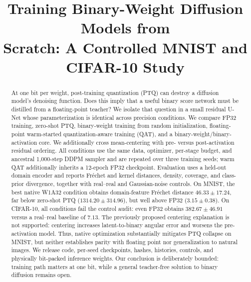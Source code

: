 \documentclass[conference]{IEEEtran}
\begin{document}
\title{Training Binary-Weight Diffusion Models from\\
Scratch: A Controlled MNIST and CIFAR-10 Study}

\author{
\and
{}
\and
{}
}

\maketitle

\begin{abstract}
At one bit per weight, post-training quantization (PTQ) can destroy a diffusion
model's denoising function. Does this imply that a useful binary score network
must be distilled from a floating-point teacher? We isolate that question in a
small residual U-Net whose parameterization is identical across precision
conditions. We compare FP32 training, zero-shot PTQ, binary-weight training from
random initialization, floating-point warm-started quantization-aware training
(QAT), and a binary-weight/binary-activation core. We additionally cross
mean-centering with pre- versus post-activation residual ordering. All conditions
use the same data, optimizer, per-stage budget, and ancestral 1,000-step DDPM
sampler and are repeated over three training seeds; warm QAT additionally
inherits a 12-epoch FP32 checkpoint. Evaluation uses a held-out
domain encoder and reports Fr\'echet and kernel distances, density, coverage, and
class-prior divergence, together with real--real and Gaussian-noise controls.
On MNIST, the best native W1A32 condition obtains domain-feature Fr\'echet distance
$46.33\mathbin{\pm}17.24$, far below zero-shot PTQ
($1314.20\mathbin{\pm}314.96$), but well above FP32
($3.15\mathbin{\pm}0.38$). On CIFAR-10, all conditions fail the control audit:
even FP32 obtains $382.67\mathbin{\pm}46.91$ versus a real--real baseline of
$7.13$. The previously proposed centering explanation is not
supported: centering increases latent-to-binary angular error and worsens the
pre-activation model. Thus, native optimization substantially mitigates PTQ
collapse on MNIST, but neither establishes parity with floating point nor
generalization to natural images.
We release code, per-seed checkpoints, hashes, histories, controls, and physically
bit-packed inference weights. Our conclusion is deliberately bounded: training
path matters at one bit, while a general teacher-free solution to binary diffusion
remains open.
\end{abstract}
\end{document}
